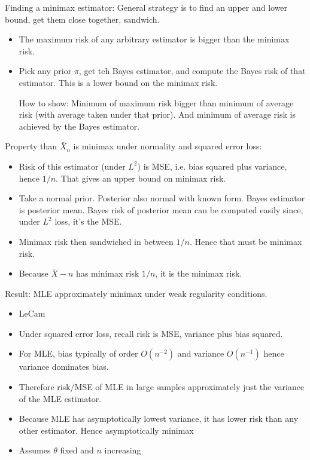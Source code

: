 \documentclass[12pt]{article}
\theoremstyle{plain}
\theoremstyle{definition}
\theoremstyle{remark}
\begin{document}
Finding a minimax estimator:
General strategy is to find an upper and lower bound, get them close
together, sandwich.
\begin{itemize}
  \item The maximum risk of any arbitrary estimator is bigger than the
    minimax risk.

  \item Pick any prior $\pi$, get teh Bayes estimator, and compute the
    Bayes risk of that estimator.
    This is a lower bound on the minimax risk.

    How to show:
    Minimum of maximum risk bigger than minimum of average risk (with
    average taken under that prior). And minimum of average risk is
    achieved by the Bayes estimator.
\end{itemize}
Property than $\bar{X}_n$ is minimax under normality and squared error
loss:
\begin{itemize}
  \item Risk of this estimator (under $L^2$) is MSE, i.e. bias squared
    plus variance, hence $1/n$.
    That gives an upper bound on minimax risk.
  \item Take a normal prior.
    Posterior also normal with known form.
    Bayes estimator is posterior mean.
    Bayes risk of posterior mean can be computed easily since, under
    $L^2$ loss, it's the MSE.
  \item Minimax risk then sandwiched in between $1/n$.
    Hence that must be minimax risk.
  \item Because $\bar{X}-n$ has minimax risk $1/n$, it is the minimax
    risk.
\end{itemize}
Result: MLE approximately minimax under weak regularity conditions.
\begin{itemize}
  \item LeCam
  \item Under squared error loss, recall risk is MSE, variance plus bias
    squared.
  \item For MLE, bias typically of order $O(n^{-2})$ and variance
    $O(n^{-1})$ hence variance dominates bias.
  \item Therefore risk/MSE of MLE in large samples approximately just
    the variance of the MLE estimator.
  \item Because MLE has asymptotically lowest variance, it has lower
    risk than any other estimator.
    Hence asymptotically minimax
  \item Assumes $\theta$ fixed and $n$ increasing
\end{itemize}
\end{document}
